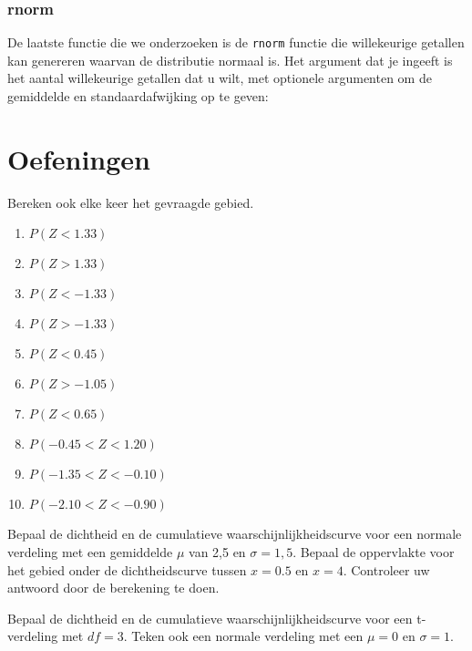 

\subsubsection{rnorm}

De laatste functie die we onderzoeken is de \texttt{rnorm} functie die willekeurige getallen kan genereren waarvan de distributie normaal is. Het argument dat je ingeeft is het aantal willekeurige getallen dat u wilt, met optionele argumenten om de gemiddelde en standaardafwijking op te geven:



\section{Oefeningen}
\label{sec:steekproefonderzoek-oefeningen}

\begin{exercise}
  \label{ex:prob-norm-dist}
  Bereken ook elke keer het gevraagde gebied.
  \begin{enumerate}[label=\alph*.]
    \item $P(Z < 1.33)$
    \item $P(Z > 1.33)$
    \item $P(Z < -1.33)$
    \item $P(Z > -1.33)$
    \item $P(Z < 0.45)$
    \item $P(Z > -1.05)$
    \item $P(Z < 0.65)$
    \item $P(-0.45 < Z < 1.20)$
    \item $P(-1.35 < Z < -0.10)$
    \item $P(-2.10 < Z < -0.90)$
  \end{enumerate}
\end{exercise}

\begin{exercise}
	Bepaal de dichtheid en de cumulatieve waarschijnlijkheidscurve voor een normale verdeling met een gemiddelde $\mu$
	van 2,5 en $\sigma = 1,5$. Bepaal de oppervlakte voor het gebied onder de dichtheidscurve tussen
	$x = 0.5$ en $x = 4$. Controleer uw antwoord door de berekening te doen.
\end{exercise}

\begin{exercise}
	Bepaal de dichtheid en de cumulatieve waarschijnlijkheidscurve voor een t-verdeling met $df = 3$. Teken ook een normale verdeling met een $\mu = 0$  en $\sigma = 1$.
\end{exercise}

